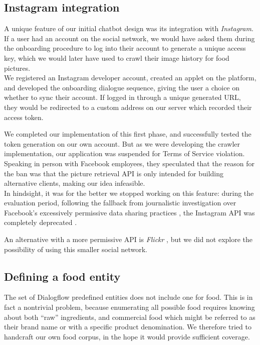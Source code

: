 \subsection{Instagram integration}
A unique feature of our initial chatbot design was its integration with \textit{Instagram}. If a user had an account on the social network, we would have asked them during the onboarding procedure to log into their account to generate a unique access key, which we would later have used to crawl their image history for food pictures.\\
We registered an Instagram developer account, created an applet on the platform, and developed the onboarding dialogue sequence, giving the user a choice on whether to sync their account. If logged in through a unique generated URL, they would be redirected to a custom address on our server which recorded their access token.

We completed our implementation of this first phase, and successfully tested the token generation on our own account. But as we were developing the crawler implementation, our application was suspended for Terms of Service violation. Speaking in person with Facebook employees, they speculated that the reason for the ban was that the picture retrieval API is only intended for building alternative clients, making our idea infeasible. \\
In hindsight, it was for the better we stopped working on this feature: during the evaluation period, following the fallback from journalistic investigation over Facebook's excessively permissive data sharing practices \cite{cambridgeanalytica}, the Instagram API was completely deprecated \cite{instagramdeprecated}.

An alternative with a more permissive API is \textit{Flickr} \cite{flickr}, but we did not explore the possibility of using this smaller social network.
\subsection{Defining a food entity}
The set of Dialogflow predefined entities does not include one for food. This is in fact a nontrivial problem, because enumerating all possible food requires knowing about both ``raw'' ingredients, and commercial food which might be referred to as their brand name or with a specific product denomination. We therefore tried to handcraft our own food corpus, in the hope it would provide sufficient coverage.


